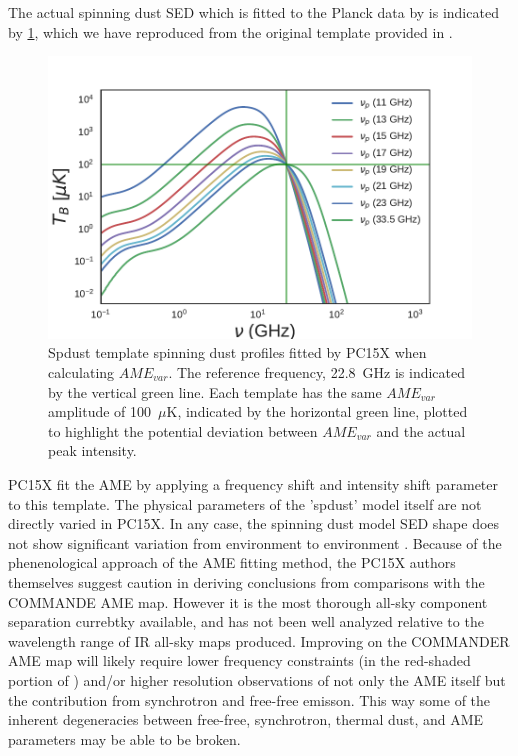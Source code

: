         The actual spinning dust SED which is fitted to the Planck data by is indicated by \ref{fig:AME_commander_freqshift_templ}, which we have reproduced from the original template provided in \cite{ali-haimoud09}.
        \begin{figure}
          \includegraphics[width=\textwidth]{../Plots/ch_datasources/AME_commander_freqshift_templ.pdf}
          \centering
          \caption{Spdust template spinning dust profiles fitted by PC15X when calculating $AME_{var}$.  The reference frequency, 22.8~GHz is indicated by the vertical green line. Each template has the same $AME_{var}$ amplitude of 100~$\mu$K, indicated by the horizontal green line, plotted to highlight the potential deviation between $AME_{var}$ and the actual peak intensity. }
          \label{fig:AME_commander_freqshift_templ}
      \end{figure}
      PC15X fit the AME by applying a frequency shift and intensity shift parameter to this template. The physical parameters of the 'spdust' model itself are not directly varied in PC15X. In any case, the spinning dust model SED shape does not show significant variation from environment to environment \citep{ali-haimoud09}.
     Because of the phenenological approach of the AME fitting method, the PC15X authors themselves suggest caution in deriving conclusions from comparisons with the COMMANDE AME map. However it is the most thorough all-sky component separation currebtky available, and has not been well analyzed relative to the wavelength range of IR all-sky maps produced. Improving on the COMMANDER AME map will likely require lower frequency constraints (in the red-shaded portion of ) and/or higher resolution observations of not only the AME itself but the contribution from synchrotron and free-free emisson. This way some of the inherent degeneracies between free-free, synchrotron, thermal dust, and AME parameters may be able to be broken.
